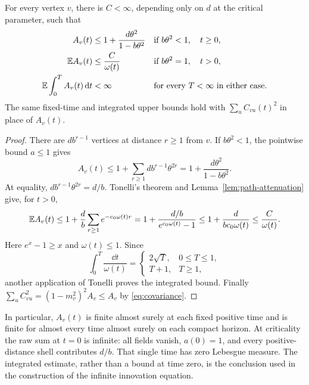 \begin{proposition}
\label{prop:row-energy}
For every vertex \(v\), there is \(C<\infty\), depending only on \(d\)
at the critical parameter, such that
\begin{equation}
\label{eq:row-energy}
 \begin{aligned}
 A_v(t)&\le1+\frac{d\theta^2}{1-b\theta^2}
      &&\text{if }b\theta^2<1,\quad t\ge0,\\
 \mathbb E A_v(t)&\le\frac{C}{\omega(t)}
      &&\text{if }b\theta^2=1,\quad t>0,\\
 \mathbb E\int_0^T A_v(t)\,\mathrm d t&<\infty
      &&\text{for every }T<\infty\text{ in either case}.
 \end{aligned}
\end{equation}
The same fixed-time and integrated upper bounds hold with
\(\sum_u C_{vu}(t)^2\) in place of \(A_v(t)\).
\end{proposition}

\begin{proof}
There are \(db^{r-1}\) vertices at distance \(r\ge1\) from \(v\).
If \(b\theta^2<1\), the pointwise bound \(a\le1\) gives
\[
 A_v(t)\le1+\sum_{r\ge1}db^{r-1}\theta^{2r}
       =1+\frac{d\theta^2}{1-b\theta^2}.
\]
At equality, \(db^{r-1}\theta^{2r}=d/b\).  Tonelli's theorem and
Lemma~\ref{lem:path-attenuation} give, for \(t>0\),
\[
 \mathbb E A_v(t)
  \le1+\frac db\sum_{r\ge1}e^{-c_0\omega(t)r}
  =1+\frac{d/b}{e^{c_0\omega(t)}-1}
  \le1+\frac{d}{bc_0\omega(t)}
  \le\frac{C}{\omega(t)}.
\]
Here \(e^x-1\ge x\) and \(\omega(t)\le1\).
Since
\[
 \int_0^T\frac{\dd t}{\omega(t)}
   =
   \begin{cases}
     2\sqrt T,&0\le T\le1,\\
     T+1,&T\ge1,
   \end{cases}
\]
another application of Tonelli proves the integrated bound.
Finally \(\sum_u C_{vu}^2=(1-m_v^2)^2A_v\le A_v\) by
\eqref{eq:covariance}.
\end{proof}

In particular, \(A_v(t)\) is finite almost surely at each fixed
positive time and is finite for almost every time almost surely on
each compact horizon.  At criticality the raw sum at \(t=0\) is
infinite: all fields vanish, \(a(0)=1\), and every positive-distance
shell contributes \(d/b\).  That single time has zero Lebesgue measure.
The integrated estimate, rather than a bound at time zero, is the
conclusion used in the construction of the infinite innovation equation.
